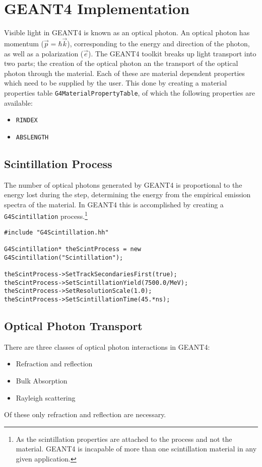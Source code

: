 

\section*{GEANT4 Implementation}
Visible light in GEANT4 is known as an optical photon.
An optical photon has momentum ($\vec{p} = \hbar \vec{k}$), corresponding to the energy and direction of the photon, as well as a polarization ($\vec{e}$).
The GEANT4 toolkit breaks up light transport into two parts; the creation of the optical photon an  the transport of the optical photon through the material.
Each of these are material dependent properties which need to be supplied by the user.
This done by creating a material properties table \lstinline{G4MaterialPropertyTable}, of which the following properties are available:
\begin{itemize}
    \item \verb+RINDEX+
    \item \verb+ABSLENGTH+
\end{itemize}
\subsection*{Scintillation Process}
The number of optical photons generated by GEANT4 is proportional to the energy lost during the step, determining the energy from the empirical emission spectra of the material.
In GEANT4 this is accomplished by creating a \verb+G4Scintillation+ process.\footnote{As the scintillation properties are attached to the process and not the material. GEANT4 is incapable of more than one scintillation material in any given application.}
\begin{lstlisting}
#include "G4Scintillation.hh"

G4Scintillation* theScintProcess = new G4Scintillation("Scintillation");

theScintProcess->SetTrackSecondariesFirst(true);
theScintProcess->SetScintillationYield(7500.0/MeV);
theScintProcess->SetResolutionScale(1.0);
theScintProcess->SetScintillationTime(45.*ns);
\end{lstlisting}

\subsection*{Optical Photon Transport}
There are three classes of optical photon interactions in GEANT4:
\begin{itemize}
    \item Refraction and reflection
    \item Bulk Absorption
    \item Rayleigh scattering
\end{itemize}
Of these only refraction and reflection are necessary. %

